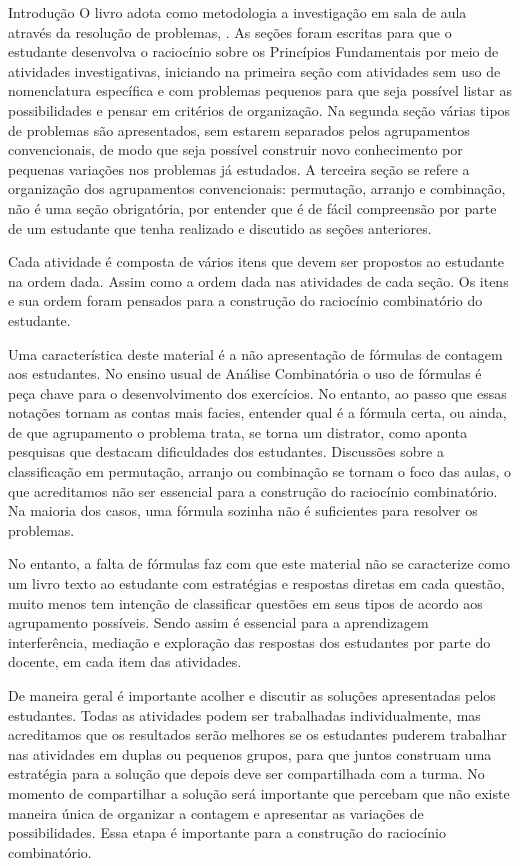 \begin{apresentacao}{Introdução}
O livro adota como metodologia a investigação em sala de aula através da resolução de problemas, \cite{Ponte}. As seções foram escritas para que o estudante desenvolva o raciocínio sobre os Princípios Fundamentais por meio de atividades investigativas, iniciando na primeira seção com atividades  sem uso de nomenclatura específica e com problemas pequenos para que seja possível listar as possibilidades e pensar em critérios de organização. Na segunda seção várias tipos de problemas são apresentados, sem estarem separados pelos agrupamentos convencionais, de modo que seja possível construir novo conhecimento por pequenas variações nos problemas já estudados. A terceira seção se refere a organização dos agrupamentos convencionais: permutação, arranjo e combinação, não é uma seção obrigatória, por entender que é de fácil compreensão por parte de um estudante que tenha realizado e discutido as seções anteriores.
 
Cada atividade é composta de vários itens que devem ser propostos ao estudante na ordem dada. Assim como a ordem dada nas atividades de cada seção.  Os itens e sua ordem foram pensados para a construção do raciocínio combinatório do estudante.
 
Uma característica deste material é a não apresentação de fórmulas de contagem aos estudantes. No ensino usual de Análise Combinatória o uso de fórmulas é peça chave para o desenvolvimento dos exercícios. No entanto, ao passo que essas notações tornam as contas mais facies, entender qual é a fórmula certa, ou ainda, de que agrupamento o problema trata, se torna um distrator, como aponta pesquisas que destacam dificuldades dos estudantes. Discussões sobre a classificação em permutação, arranjo ou combinação se tornam o foco das aulas, o que acreditamos não ser essencial para a construção do raciocínio combinatório. Na maioria dos casos, uma fórmula sozinha não é suficientes para resolver os problemas.
  
 No entanto, a falta de fórmulas faz com que este material não se caracterize como um livro texto ao estudante com estratégias e respostas diretas  em  cada questão, muito menos tem intenção de  classificar questões em seus tipos de acordo aos agrupamento possíveis. Sendo assim é essencial para a aprendizagem interferência, mediação e exploração das respostas dos estudantes por parte do docente, em cada item das atividades. 
 
 De maneira geral é importante acolher e discutir as soluções apresentadas pelos estudantes. Todas as atividades podem ser trabalhadas individualmente, mas acreditamos que  os resultados serão melhores se os estudantes puderem trabalhar nas atividades em duplas ou pequenos grupos,  para que juntos construam uma estratégia para a solução que depois deve ser compartilhada com a turma.  No momento de compartilhar a solução será importante que percebam que não existe maneira única de organizar a contagem e apresentar as variações de possibilidades. Essa etapa é importante para a construção do raciocínio combinatório.
 

\end{apresentacao}
